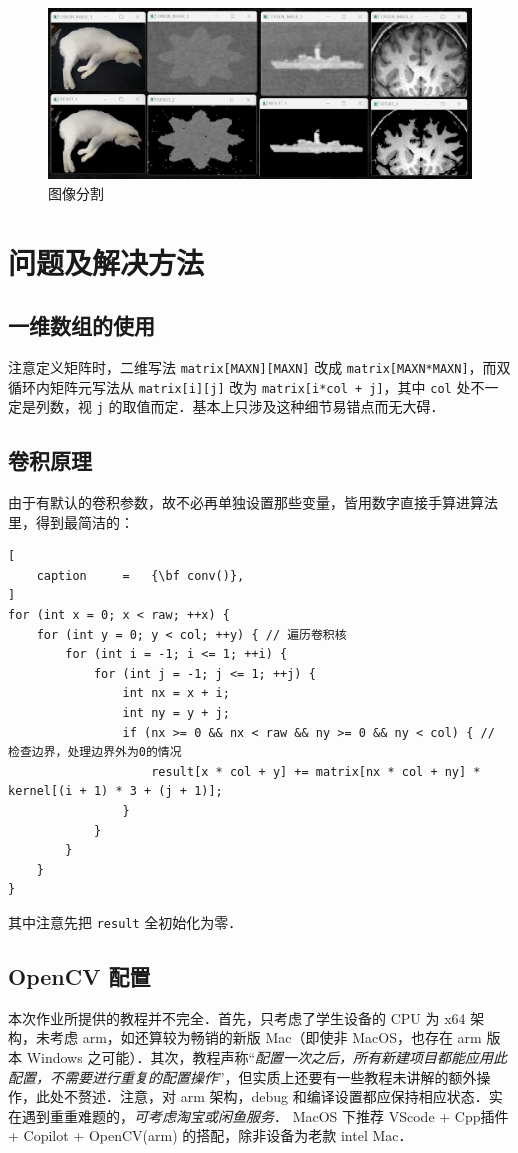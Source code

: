 \documentclass[12pt,a4paper,twoside]{ctexart}
\numberwithin{figure}{section}
\numberwithin{equation}{section}
\begin{document}
\begin{figure}[ht]
    \centering
    \includegraphics[width=.6\textwidth]{seg.jpg}
    \caption{图像分割}
\end{figure}



\newpage
\section{问题及解决方法}
\subsection{一维数组的使用}
注意定义矩阵时，二维写法 \verb|matrix[MAXN][MAXN]| 改成 \verb|matrix[MAXN*MAXN]|，而双循环内矩阵元写法从 \verb|matrix[i][j]| 改为 \verb|matrix[i*col + j]|，其中 \verb|col| 处不一定是列数，视 \verb|j| 的取值而定．基本上只涉及这种细节易错点而无大碍．

\subsection{卷积原理}\label{sec:conv}
由于有默认的卷积参数，故不必再单独设置那些变量，皆用数字直接手算进算法里，得到最简洁的：
\begin{lstlisting}[
    caption     =   {\bf conv()},
]
for (int x = 0; x < raw; ++x) {
    for (int y = 0; y < col; ++y) { // 遍历卷积核
        for (int i = -1; i <= 1; ++i) {
            for (int j = -1; j <= 1; ++j) {
                int nx = x + i;
                int ny = y + j;
                if (nx >= 0 && nx < raw && ny >= 0 && ny < col) { // 检查边界，处理边界外为0的情况
                    result[x * col + y] += matrix[nx * col + ny] * kernel[(i + 1) * 3 + (j + 1)];
                }
            }
        }
    }
}
\end{lstlisting}
其中注意先把 \verb|result| 全初始化为零．

\subsection{OpenCV 配置}
本次作业所提供的教程并不完全．首先，只考虑了学生设备的 CPU 为 x64 架构，未考虑 arm，如还算较为畅销的新版 Mac（即使非 MacOS，也存在 arm 版本 Windows 之可能）．其次，教程声称“\textit{配置一次之后，所有新建项目都能应用此配置，不需要进行重复的配置操作}”，但实质上还要有一些教程未讲解的额外操作，此处不赘述．注意，对 arm 架构，debug 和编译设置都应保持相应状态．实在遇到重重难题的，\textit{可考虑淘宝或闲鱼服务}．
MacOS 下推荐 VScode + Cpp插件 + Copilot + OpenCV(arm) 的搭配，除非设备为老款 intel Mac．
\end{document}
